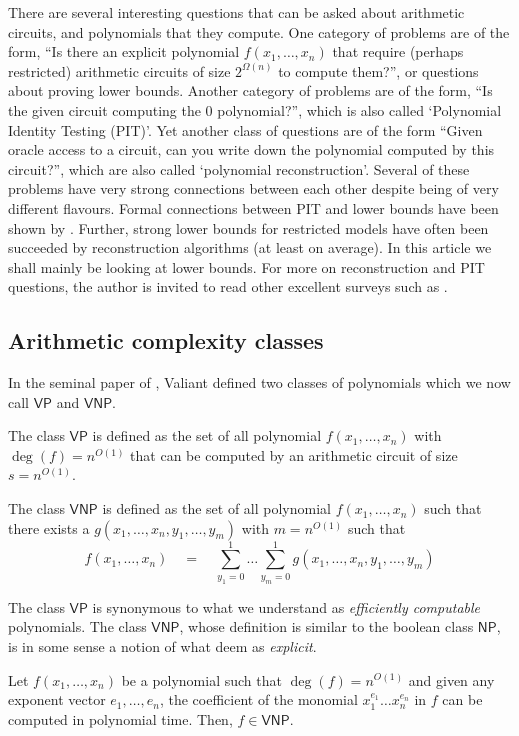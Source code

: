 \documentclass{beatcs}
\newcommand{\VP}{\mathsf{VP}}
\newcommand{\VNP}{\mathsf{VNP}}
\newcommand{\NP}{\mathsf{NP}}
\begin{document}
There are several interesting questions that can be asked about arithmetic circuits, and polynomials that they compute. One category of problems are of the form, ``Is there an explicit polynomial $f(x_1,\dots, x_n)$ that require (perhaps restricted) arithmetic circuits of size $2^{\Omega(n)}$ to compute them?'', or questions about proving lower bounds. Another category of problems are of the form, ``Is the given circuit computing the $0$ polynomial?'', which is also called `Polynomial Identity Testing (PIT)'. Yet another class of questions are of the form ``Given oracle access to a circuit, can you write down the polynomial computed by this circuit?'', which are also called `polynomial reconstruction'. Several of these problems have very strong connections between each other despite being of very different flavours. Formal connections between PIT and lower bounds have been shown by \cite{ki03,a05}. Further, strong lower bounds for restricted models have often been succeeded by reconstruction algorithms (at least on average). In this article we shall mainly be looking at lower bounds. For more on reconstruction and PIT questions, the author is invited to read other excellent surveys such as \cite{sy10,ckw11}. 

\subsection{Arithmetic complexity classes}
In the seminal paper of \cite{v79}, Valiant defined two classes of polynomials which we now call $\VP$ and $\VNP$. 

\begin{definition}
The class $\VP$ is defined as the set of all polynomial $f(x_1,\dots, x_n)$ with $\deg(f) = n^{O(1)}$ that can be computed by an arithmetic circuit of size $s = n^{O(1)}$. 

The class $\VNP$ is defined as the set of all polynomial $f(x_1,\dots, x_n)$ such that there exists a $g(x_1,\dots, x_n, y_1,\dots, y_m)$ with $m = n^{O(1)}$ such that
\[
f(x_1,\dots, x_n) \quad = \quad \sum_{y_1=0}^1\dots \sum_{y_m=0}^1 g(x_1,\dots, x_n, y_1,\dots, y_m)
\]
\end{definition}
The class $\VP$ is synonymous to what we understand as \emph{efficiently computable} polynomials. The class $\VNP$, whose definition is similar to the boolean class $\NP$, is in some sense a notion of what deem as \emph{explicit}. 

\begin{fact}\label{fact:VNP-explicit}
Let $f(x_1,\dots, x_n)$ be a polynomial such that $\deg(f) = n^{O(1)}$ and given any exponent vector $e_1,\dots, e_n$, the coefficient of the monomial $x_1^{e_1}\dots x_n^{e_n}$ in $f$ can be computed in polynomial time. Then, $f \in \VNP$. 
\end{fact}
\end{document}
